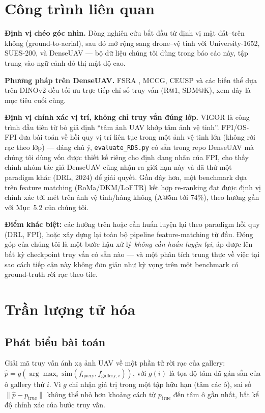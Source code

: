 \documentclass[11pt]{article}
\begin{document}
\section{Công trình liên quan}

\textbf{Định vị chéo góc nhìn.} Dòng nghiên cứu bắt đầu từ định vị mặt đất--trên không (ground-to-aerial), sau đó mở rộng sang drone--vệ tinh với University-1652, SUES-200, và DenseUAV — bộ dữ liệu chúng tôi dùng trong báo cáo này, tập trung vào ngữ cảnh đô thị mật độ cao.

\textbf{Phương pháp trên DenseUAV.} FSRA \cite{fsra}, MCCG, CEUSP và các biến thể dựa trên DINOv2 đều tối ưu trực tiếp chỉ số truy vấn (R@1, SDM@K), xem đây là mục tiêu cuối cùng.

\textbf{Định vị chính xác vị trí, không chỉ truy vấn đúng lớp.} VIGOR là công trình đầu tiên từ bỏ giả định ``tâm ảnh UAV khớp tâm ảnh vệ tinh''. FPI/OS-FPI đưa bài toán về hồi quy vị trí liên tục trong một ảnh vệ tinh lớn (không rời rạc theo lớp) — đáng chú ý, \texttt{evaluate\_RDS.py} có sẵn trong repo DenseUAV mà chúng tôi dùng vốn được thiết kế riêng cho định dạng nhãn của FPI, cho thấy chính nhóm tác giả DenseUAV cũng nhận ra giới hạn này và đã thử một paradigm khác (DRL, 2024) để giải quyết. Gần đây hơn, một benchmark dựa trên feature matching (RoMa/DKM/LoFTR) kết hợp re-ranking \cite{camp2025} đạt được định vị chính xác tới mét trên ảnh vệ tinh/hàng không (A@5m tới 74\%), theo hướng gần với Mục~5.2 của chúng tôi.

\textbf{Điểm khác biệt:} các hướng trên hoặc cần huấn luyện lại theo paradigm hồi quy (DRL, FPI), hoặc xây dựng lại toàn bộ pipeline feature-matching từ đầu. Đóng góp của chúng tôi là một bước hậu xử lý \emph{không cần huấn luyện lại}, áp được lên bất kỳ checkpoint truy vấn có sẵn nào — và một phân tích trung thực về việc tại sao cách tiếp cận này không đơn giản như kỳ vọng trên một benchmark có ground-truth rời rạc theo tile.

\section{Trần lượng tử hóa}

\subsection{Phát biểu bài toán}
Giải mã truy vấn ánh xạ ảnh UAV về một phần tử rời rạc của gallery: $\hat{p} = g(\arg\max_i \, \text{sim}(f_{\text{query}}, f_{\text{gallery}, i}))$, với $g(i)$ là tọa độ tâm đã gán sẵn của ô gallery thứ $i$. Vì $g$ chỉ nhận giá trị trong một tập hữu hạn (tâm các ô), sai số $\|\hat{p} - p_{\text{true}}\|$ không thể nhỏ hơn khoảng cách từ $p_{\text{true}}$ đến tâm ô gần nhất, bất kể độ chính xác của bước truy vấn.
\end{document}
